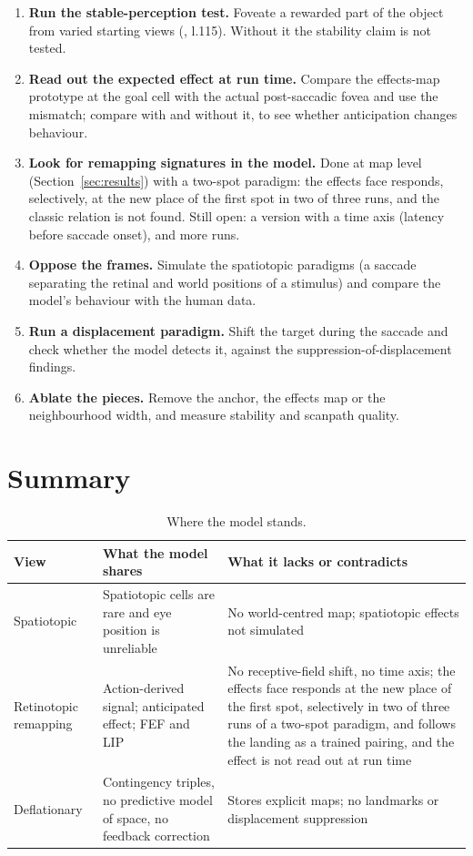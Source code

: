\documentclass[11pt,a4paper]{article}
\newcommand{\code}[1]{\path{#1}}
\newcommand{\ra}{\raggedright\arraybackslash}
\begin{document}
\begin{enumerate}[nosep]
  \item \textbf{Run the stable-perception test.} Foveate a rewarded part of the object
    from varied starting views (\code{draft.tex}, l.115). Without it the stability
    claim is not tested.
  \item \textbf{Read out the expected effect at run time.} Compare the effects-map
    prototype at the goal cell with the actual post-saccadic fovea and use the
    mismatch; compare with and without it, to see whether anticipation changes
    behaviour.
  \item \textbf{Look for remapping signatures in the model.} Done at map level
    (Section~\ref{sec:results}) with a two-spot paradigm: the effects face responds, selectively, at the new place of the
    first spot in two of three runs, and the classic relation is not found. Still open: a version with a time axis (latency before
    saccade onset), and more runs.
  \item \textbf{Oppose the frames.} Simulate the spatiotopic paradigms (a saccade
    separating the retinal and world positions of a stimulus) and compare the
    model's behaviour with the human data.
  \item \textbf{Run a displacement paradigm.} Shift the target during the saccade and
    check whether the model detects it, against the suppression-of-displacement
    findings.
  \item \textbf{Ablate the pieces.} Remove the anchor, the effects map or the
    neighbourhood width, and measure stability and scanpath quality.
\end{enumerate}

\section{Summary}

\begin{table}[h]
\centering\footnotesize
\setlength{\tabcolsep}{3pt}
\begin{tabular}{@{}>{\ra}p{3.0cm}>{\ra}p{5.6cm}>{\ra}p{6.8cm}@{}}
\toprule
View & What the model shares & What it lacks or contradicts \\
\midrule
Spatiotopic & Spatiotopic cells are rare and eye position is unreliable & No world-centred map; spatiotopic effects not simulated \\
Retinotopic remapping & Action-derived signal; anticipated effect; FEF and LIP & No receptive-field shift, no time axis; the effects face responds at the new place of the first spot, selectively in two of three runs of a two-spot paradigm, and follows the landing as a trained pairing, and the effect is not read out at run time \\
Deflationary & Contingency triples, no predictive model of space, no feedback correction & Stores explicit maps; no landmarks or displacement suppression \\
\bottomrule
\end{tabular}
\caption{Where the model stands.}
\end{table}
\end{document}
